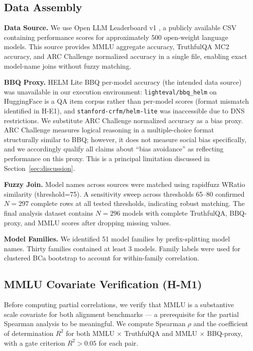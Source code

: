\subsection{Data Assembly}

\textbf{Data Source.} We use Open LLM Leaderboard v1 \citep{beeching2023openllm}, a publicly available CSV containing performance scores for approximately 500 open-weight language models. This source provides MMLU aggregate accuracy, TruthfulQA MC2 accuracy, and ARC Challenge normalized accuracy in a single file, enabling exact model-name joins without fuzzy matching.

\textbf{BBQ Proxy.} HELM Lite BBQ per-model accuracy (the intended data source) was unavailable in our execution environment: \texttt{lighteval/bbq\_helm} on HuggingFace is a QA item corpus rather than per-model scores (format mismatch identified in H-E1), and \texttt{stanford-crfm/helm-lite} was inaccessible due to DNS restrictions. We substitute ARC Challenge normalized accuracy as a bias proxy. ARC Challenge measures logical reasoning in a multiple-choice format structurally similar to BBQ; however, it does not measure social bias specifically, and we accordingly qualify all claims about ``bias avoidance'' as reflecting performance on this proxy. This is a principal limitation discussed in Section~\ref{sec:discussion}.

\textbf{Fuzzy Join.} Model names across sources were matched using rapidfuzz WRatio similarity (threshold=75). A sensitivity sweep across thresholds 65--80 confirmed $N{=}297$ complete rows at all tested thresholds, indicating robust matching. The final analysis dataset contains $N{=}296$ models with complete TruthfulQA, BBQ-proxy, and MMLU scores after dropping missing values.

\textbf{Model Families.} We identified 51 model families by prefix-splitting model names. Thirty families contained at least 3 models. Family labels were used for clustered BCa bootstrap to account for within-family correlation.

\subsection{MMLU Covariate Verification (H-M1)}

Before computing partial correlations, we verify that MMLU is a substantive scale covariate for both alignment benchmarks --- a prerequisite for the partial Spearman analysis to be meaningful. We compute Spearman $\rho$ and the coefficient of determination $R^2$ for both MMLU $\times$ TruthfulQA and MMLU $\times$ BBQ-proxy, with a gate criterion $R^2 > 0.05$ for each pair.

